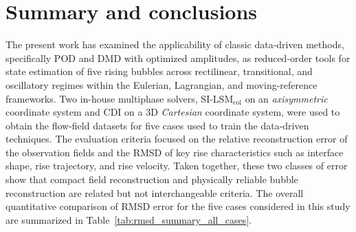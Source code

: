 \documentclass[a4paper,fleqn]{cas-sc}
\begin{document}
	\section{Summary and conclusions}
	\label{Conclusion}
	
	The present work has examined the applicability of classic data-driven methods, specifically POD and DMD with optimized amplitudes, as reduced-order tools for state estimation of five rising bubbles across rectilinear, transitional, and oscillatory regimes within the Eulerian, Lagrangian, and moving-reference frameworks. Two in-house multiphase solvers, SI-LSM$_{\text{col}}$ on an \textit{axisymmetric} coordinate system and CDI on a 3D \textit{Cartesian} coordinate system, were used to obtain the flow-field datasets for five cases used to train the data-driven techniques. The evaluation criteria focused on the relative reconstruction error of the observation fields and the RMSD of key rise characteristics such as interface shape, rise trajectory, and rise velocity. Taken together, these two classes of error show that compact field reconstruction and physically reliable bubble reconstruction are related but not interchangeable criteria. The overall quantitative comparison of RMSD error for the five cases considered in this study are summarized in Table~\ref{tab:rmsd_summary_all_cases}. 
	
\end{document}
